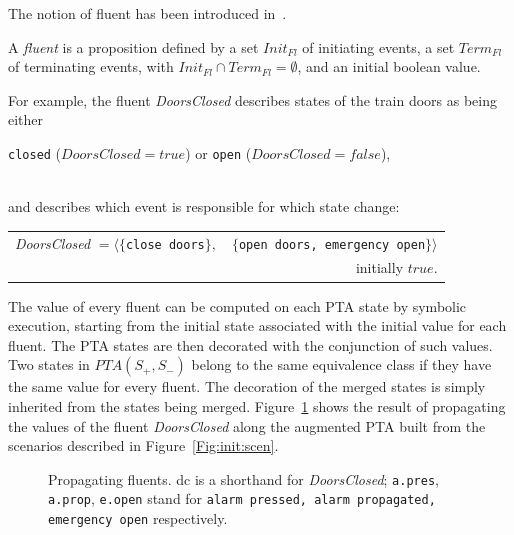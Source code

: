 The notion of fluent has been introduced in~\cite{Giannakopoulou:2003}.

\begin{definition}[Fluent]
A \emph{fluent} 
is a proposition defined by a set $Init_{Fl}$ of initiating events, a set $Term_{Fl}$ of 
terminating events, with $Init_{Fl}\cap Term_{Fl} = \emptyset$, and an initial boolean value.
\end{definition}

\noindent
For example, the fluent \emph{DoorsClosed} describes states of the train doors as being either \\
\centerline{\texttt{closed} ($DoorsClosed = true$) or \texttt{open} ($DoorsClosed = false$),} \\
and describes which event is responsible for which state change:

\hspace*{-.5cm}
\begin{small}
\begin{tabular}{lr}
\emph{DoorsClosed} $=\langle\{$\texttt{close doors}$\},$ &$\{$\texttt{open doors, emergency open}$\}\rangle$\\
&initially $true$.\\
\end{tabular}
\end{small}

The value of every fluent can be computed on each PTA state by symbolic execution, starting from the initial state associated with the initial value for each fluent. The PTA states are then decorated with the conjunction of such values. Two states in $PTA(S_+, S_-)$ belong to the same equivalence class if they have the same value for every fluent. The decoration of the merged states is simply inherited from the states being merged. Figure~\ref{Fig:fluents} shows the result of propagating the values of the fluent \emph{DoorsClosed} along the augmented PTA built from the scenarios described in Figure~\ref{Fig:init:scen}.

\begin{figure}[H]
\centering
{}
\caption{Propagating fluents\label{Fig:fluents}. {\small dc is a shorthand for \emph{DoorsClosed}; \texttt{a.pres}, \texttt{a.prop}, \texttt{e.open} stand for \texttt{alarm pressed, alarm propagated, emergency open} respectively}.}
\end{figure}

